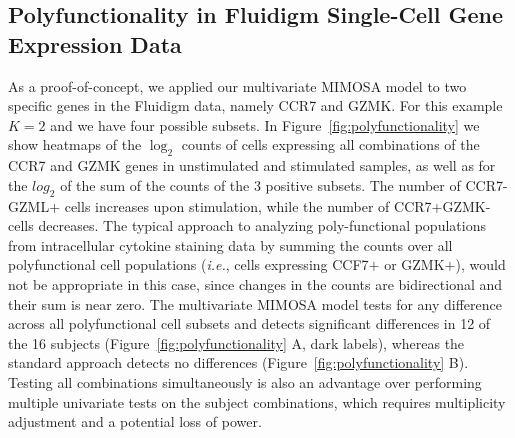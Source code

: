 \documentclass[12pt,oupdraft]{biostatistics}
\begin{document}
\subsection{Polyfunctionality in Fluidigm Single-Cell Gene Expression Data}
As a proof-of-concept, we applied our multivariate MIMOSA model to two specific genes in the Fluidigm data, namely CCR7 and GZMK. For this example $K=2$ and we have four possible subsets.
In Figure~\ref{fig:polyfunctionality} we show heatmaps of the $\log_2$ counts of cells expressing all combinations of the CCR7 and GZMK genes in unstimulated and stimulated samples, as well as for the $log_2$ of the sum of the counts of the 3 positive subsets. The number of CCR7-GZML+ cells increases upon stimulation, while the number of CCR7+GZMK- cells decreases. The typical approach to analyzing poly-functional populations from intracellular cytokine staining data by summing the counts over all polyfunctional cell populations (\textit{i.e.}, cells expressing CCF7$+$ or GZMK$+$), would not be appropriate in this case, since changes in the counts are bidirectional and their sum is near zero. The multivariate MIMOSA model tests for any difference across all polyfunctional cell subsets and detects significant differences in 12 of the 16 subjects (Figure~\ref{fig:polyfunctionality} A, dark labels), whereas the standard approach detects no differences (Figure~\ref{fig:polyfunctionality} B). Testing all combinations simultaneously is also an advantage over performing multiple univariate tests on the subject combinations, which requires multiplicity adjustment and a potential loss of power.
\end{document}
